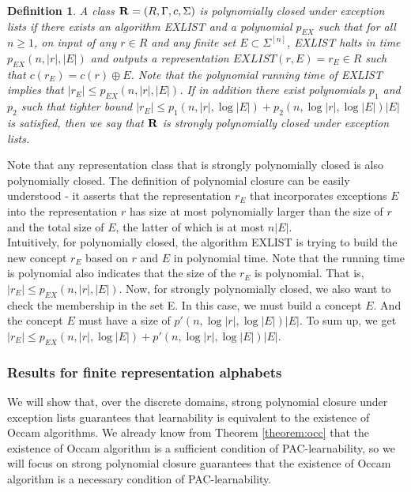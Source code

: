 \documentclass[12pt]{article}
\newtheorem{definition}[theorem]{Definition}
\begin{document}
\begin{definition} \label{definition:close}
A class ${\bf R} = (R, \Gamma, c, \Sigma)$ is \emph {polynomially closed under exception lists} if there exists an algorithm EXLIST and a polynomial $p_{EX}$ such that for all $n \ge 1$, on input of any $r \in R$ and any finite set $E \subset \Sigma^{[n]}$, EXLIST halts in time $p_{EX}(n, |r|, |E|)$ and outputs a representation $EXLIST(r, E) = r_E \in R$ such that $c(r_E) = c(r) \oplus E$. Note that the polynomial running time of EXLIST implies that $|r_E| \le p_{EX}(n, |r|, |E|)$. If in addition there exist polynomials $p_1$ and $p_2$ such that tighter bound $|r_E| \le p_1(n, |r|, \log |E|) + p_2(n, \log |r|, \log |E|)|E|$ is satisfied, then we say that ${\bf R}$ is \emph {strongly polynomially closed under exception lists}.
\end{definition}

Note that any representation class that is strongly polynomially closed is also polynomially closed. The definition of polynomial closure can be easily understood - it asserts that the representation $r_E$ that incorporates exceptions $E$ into the representation $r$ has size at most polynomially larger than the size of $r$ and the total size of $E$, the latter of which is at most $n|E|$. \\

Intuitively, for polynomially closed, the algorithm EXLIST is trying to build the new concept $r_E$ based on  $r$ and $E$ in polynomial time. Note that the running time is polynomial also indicates that the size of the $r_E$ is polynomial. That is, $|r_E| \le p_{EX}(n, |r|, |E|)$. Now, for strongly polynomially closed, we also want to check the membership in the set E. In this case, we must build a concept $E$. And the concept $E$ must have a size of $p'(n, \log |r|, \log |E|)|E|$. To sum up, we get $|r_E| \le p_{EX}(n, |r|, \log |E|) + p'(n, \log |r|, \log |E|)|E|$.

\subsubsection{Results for finite representation alphabets}

We will show that, over the discrete domains, strong polynomial closure under exception lists guarantees that learnability is equivalent to the existence of Occam algorithms. We already know from Theorem \ref{theorem:occ} that the existence of Occam algorithm is a sufficient condition of PAC-learnability, so we will focus on strong polynomial closure guarantees that the existence of Occam algorithm is a necessary condition of PAC-learnability.
\end{document}

